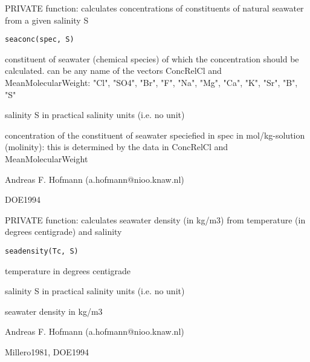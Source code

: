 \documentclass{article}
\begin{document}
\begin{Description}\relax
PRIVATE function: calculates concentrations of constituents of natural seawater from a given salinity S
\end{Description}
\begin{Usage}
\begin{verbatim}seaconc(spec, S)\end{verbatim}
\end{Usage}
\begin{Arguments}
\begin{ldescription}
\item[\code{spec }] constituent of seawater (chemical species) of which the concentration should be calculated. can be any name of the vectors ConcRelCl and MeanMolecularWeight: "Cl", "SO4", "Br", "F", "Na", "Mg", "Ca", "K", "Sr", "B", "S"
\item[\code{S }] salinity S in practical salinity units (i.e. no unit)
\end{ldescription}
\end{Arguments}
\begin{Value}
concentration of the constituent of seawater speciefied in spec in mol/kg-solution (molinity): this is determined by the data in ConcRelCl and MeanMolecularWeight
\end{Value}
\begin{Author}\relax
Andreas F. Hofmann (a.hofmann@nioo.knaw.nl)
\end{Author}
\begin{References}\relax
DOE1994
\end{References}

\begin{Description}\relax
PRIVATE function: calculates seawater density (in kg/m3) from temperature (in degrees centigrade) and salinity
\end{Description}
\begin{Usage}
\begin{verbatim}seadensity(Tc, S)\end{verbatim}
\end{Usage}
\begin{Arguments}
\begin{ldescription}
\item[\code{Tc }] temperature in degrees centigrade
\item[\code{S }] salinity S in practical salinity units (i.e. no unit)
\end{ldescription}
\end{Arguments}
\begin{Value}
seawater density in kg/m3
\end{Value}
\begin{Author}\relax
Andreas F. Hofmann (a.hofmann@nioo.knaw.nl)
\end{Author}
\begin{References}\relax
Millero1981, DOE1994
\end{References}
\end{document}
